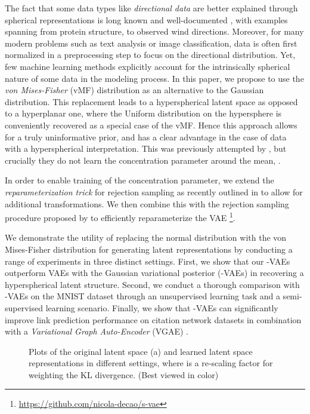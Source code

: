 \documentclass[letterpaper]{article}
\begin{document}
The fact that some data types like \textit{directional data} are better explained through spherical representations is long known and well-documented \citep{mardia1975statistics, fisher1987statistical}, with examples spanning from protein structure, to observed wind directions. Moreover, for many modern problems such as text analysis or image classification, data is often first normalized in a preprocessing step to focus on the directional distribution. Yet, few machine learning methods explicitly account for the intrinsically spherical nature of some data in the modeling process. In this paper, we propose to use the \textit{von Mises-Fisher} (vMF) distribution as an alternative to the Gaussian distribution. This replacement leads to a hyperspherical latent space as opposed to a hyperplanar one, where the Uniform distribution on the hypersphere is conveniently recovered as a special case of the vMF. Hence this approach allows for a truly uninformative prior, and has a clear advantage in the case of data with a hyperspherical interpretation. This was previously attempted by \cite{hasnat2017mises}, but crucially they do not learn the concentration parameter around the mean, .

In order to enable training of the concentration parameter, we extend the \textit{reparameterization trick} for rejection sampling as recently outlined in \cite{rejection-repar} to allow for  additional transformations. We then combine this with the rejection sampling procedure proposed by \cite{sample-vmf} to efficiently reparameterize the VAE 
\footnote{ \url{https://github.com/nicola-decao/s-vae}}.

We demonstrate the utility of replacing the normal distribution with the von Mises-Fisher distribution for generating latent representations by conducting a range of experiments in three distinct settings. First, we show that our \Sv-VAEs outperform VAEs with the Gaussian variational posterior (\Nv-VAEs) in recovering a hyperspherical latent structure. Second, we conduct a thorough comparison with \Nv-VAEs on the MNIST dataset through an unsupervised learning task and a semi-supervised learning scenario. Finally, we show that \Sv-VAEs can significantly improve link prediction performance on citation network datasets in combination with a \textit{Variational Graph Auto-Encoder} (VGAE) \citep{kipf2016VGAE}. 

\begin{figure*}[t!]
\centering
\caption{Plots of the original latent space (a) and learned latent space representations in different settings, where  is a re-scaling factor for weighting the KL divergence. (Best viewed in color)}
\label{fig:exp-toy1}
\end{figure*}
\end{document}
